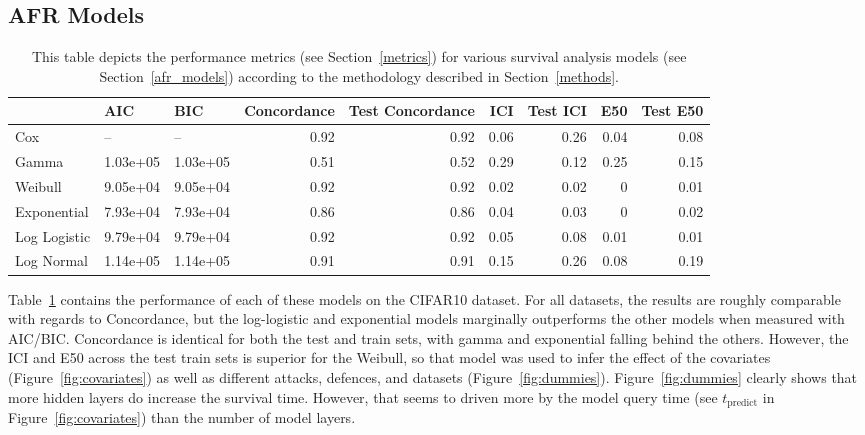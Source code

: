 \subsection{AFR Models}

\begin{table}[b!]
\centering
\begin{tabular}{lllrrrrrr}
\toprule
 & AIC & BIC & Concordance & Test Concordance & ICI & Test ICI & E50 & Test E50 \\
\midrule
Cox & -- & -- & 0.92 & 0.92 & 0.06 & 0.26 & 0.04 & 0.08 \\
Gamma & 1.03e+05 & 1.03e+05 & 0.51 & 0.52 & 0.29 & 0.12 & 0.25 & 0.15 \\
Weibull & 9.05e+04 & 9.05e+04 & 0.92 & 0.92 & 0.02 & 0.02 & 0 & 0.01 \\
Exponential & 7.93e+04 & 7.93e+04 & 0.86 & 0.86 & 0.04 & 0.03 & 0 & 0.02 \\
Log Logistic & 9.79e+04 & 9.79e+04 & 0.92 & 0.92 & 0.05 & 0.08 & 0.01 & 0.01 \\
Log Normal & 1.14e+05 & 1.14e+05 & 0.91 & 0.91 & 0.15 & 0.26 & 0.08 & 0.19 \\
\bottomrule
\end{tabular}
\caption{This table depicts the performance metrics (see Section~\ref{metrics}) for various survival analysis models (see Section~\ref{afr_models}) according to the methodology described in Section~\ref{methods}.}
\label{tab:afr_models}
\end{table}

Table~\ref{tab:afr_models} contains the performance of each of these models on the CIFAR10 dataset. For all datasets, the results are roughly comparable with regards to Concordance, but the log-logistic and exponential models marginally outperforms the other models when measured with AIC/BIC. Concordance is identical for both the test and train sets, with gamma and exponential falling behind the others. However, the ICI and E50 across the test train sets is superior for the Weibull, so that model was used to infer the effect of the covariates (Figure~\ref{fig:covariates}) as well as different attacks, defences, and datasets (Figure~\ref{fig:dummies}). Figure~\ref{fig:dummies} clearly shows that more hidden layers do increase the survival time. However, that seems to driven more by the model query time (see $t_{\mathrm{predict}}$ in Figure~\ref{fig:covariates}) than the number of model layers.

